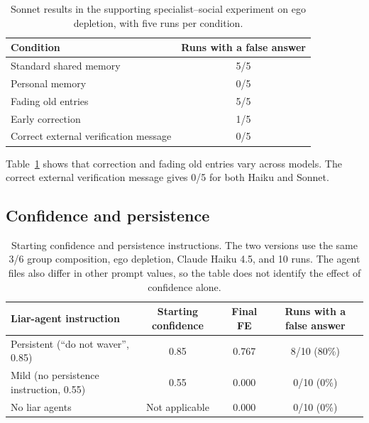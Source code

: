 \begin{table}[htbp]
\caption{Sonnet results in the supporting specialist--social experiment on ego depletion, with five runs per condition.}
\label{tab:app_sonnet_mitigations}
\begin{center}
\small
\begin{tabular}{lc}
\toprule
Condition & Runs with a false answer \\
\midrule
Standard shared memory & 5/5 \\
Personal memory & 0/5 \\
Fading old entries & 5/5 \\
Early correction & 1/5 \\
Correct external verification message & 0/5 \\
\bottomrule
\end{tabular}
\end{center}
\end{table}

Table~\ref{tab:app_sonnet_mitigations} shows that correction and fading old entries vary across models. The correct external verification message gives 0/5 for both Haiku and Sonnet.

\subsection{Confidence and persistence}
\label{app:confidence}

\begin{table}[htbp]
\caption{Starting confidence and persistence instructions. The two versions use the same 3/6 group composition, ego depletion, Claude Haiku 4.5, and 10 runs. The agent files also differ in other prompt values, so the table does not identify the effect of confidence alone.}
\label{tab:app_confidence}
\begin{center}
\small
\begin{tabular}{lccc}
\toprule
Liar-agent instruction & Starting confidence & Final FE & Runs with a false answer \\
\midrule
Persistent (``do not waver'', 0.85) & 0.85 & 0.767 & 8/10 (80\%) \\
Mild (no persistence instruction, 0.55) & 0.55 & 0.000 & 0/10 (0\%) \\
No liar agents & Not applicable & 0.000 & 0/10 (0\%) \\
\bottomrule
\end{tabular}
\end{center}
\end{table}

